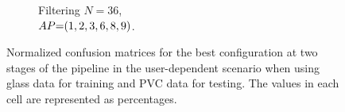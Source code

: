 \begin{figure}[ht]
\begin{subfigure}{.49\textwidth}
      \vspace{-15pt}
      \captionsetup{width=.99\linewidth}
      \caption{Filtering $N{=}36$, \\ $\splitatcommas{AP{=}(1, 2, 3, 6, 8, 9)}$.}
      \label{fig:radar-experiments:through-materials:glass-pvc-confusion:filtering-ud}
  \end{subfigure}
  
  \vspace{-6pt}
  \caption{Normalized confusion matrices for the best configuration at two stages of the pipeline in the user-dependent scenario when using glass data for training and PVC data for testing. The values in each cell are represented as percentages.}
  \label{fig:radar-experiments:through-materials:glass-pvc-confusion}
\end{figure}

